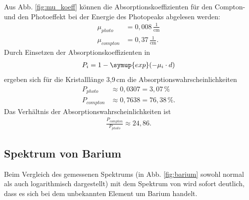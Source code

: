     Aus Abb. \ref{fig:mu_koeff} können die Absorptionskoeffizienten für den
    Compton- und den Photoeffekt bei der Energie des Photopeaks abgelesen werden:
    \begin{align*}
      \mu_{photo}& =0,008\,\frac{1}{\text{cm}}\\
      \mu_{compton}& =0,37\,\frac{1}{\text{cm}}.
    \end{align*}
    Durch Einsetzen der Absorptionskoeffizienten in
    \begin{align*}
       P_i = 1-\symup{exp}(-\mu_i\cdot d)
    \end{align*}
    ergeben sich für die Kristalllänge 3,9\,cm die Absorptionswahrscheinlichkeiten
    \begin{align*}
      P_{photo} & \approx 0,0307 = 3,07\,\% \\
      P_{compton} & \approx 0,7638 = 76,38\,\%.
    \end{align*}
    Das Verhältnis der Absorptionswahrscheinlichkeiten ist
    \begin{align*}
      \frac{P_{compton}}{P_{photo}} \approx 24,86.
    \end{align*}



  \subsection{Spektrum von Barium}

    Beim Vergleich des gemessenen Spektrums (in Abb. \ref{fig:barium}
    sowohl normal als auch logarithmisch dargestellt) mit dem Spektrum
    von  wird sofort deutlich, dass es sich bei dem
    unbekannten Element um Barium handelt. \\


